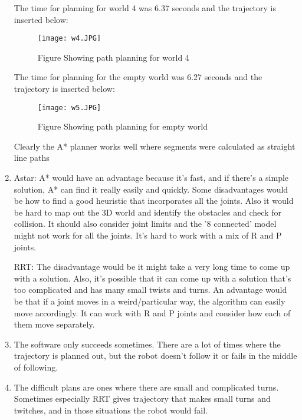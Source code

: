 \documentclass{article}
\begin{document}
\begin{enumerate}
    The time for planning for world 4 was 6.37 seconds  and the trajectory is inserted below: \\ 
    \renewcommand{\thefigure}{5.1.4.4}
\begin{center}
    \begin{figure}[H]
        \centering
        \texttt{[image: w4.JPG]}
         \caption{Figure Showing path planning for world 4}
    \end{figure}
\end{center}

   The time for planning for the empty world  was 6.27 seconds  and the trajectory is inserted below: \\ 
    \renewcommand{\thefigure}{5.1.4.5}
\begin{center}
    \begin{figure}[H]
        \centering
        \texttt{[image: w5.JPG]}
         \caption{Figure Showing path planning for empty world}
    \end{figure}
\end{center}


Clearly the A* planner works well where segments were calculated as straight line paths 
    
    \item Astar: A* would have an advantage because it's fast, and if there's a simple solution, A* can find it really easily and quickly. Some disadvantages would be how to find a good heuristic that incorporates all the joints. Also it would be hard to map out the 3D world and identify the obstacles and check for collision. It should also consider joint limits and the '8 connected' model might not work for all the joints. It's hard to work with a mix of R and P joints.
    
    RRT: The disadvantage would be it might take a very long time to come up with a solution. Also, it's possible that it can come up with a solution that's too complicated and has many small twists and turns. An advantage would be that if a joint moves in a weird/particular way, the algorithm can easily move accordingly. It can work with R and P joints and consider how each of them move separately.
    
    \item The software only succeeds sometimes. There are a lot of times where the trajectory is planned out, but the robot doesn't follow it or fails in the middle of following. 
    
    \item The difficult plans are ones where there are small and complicated turns. Sometimes especially RRT gives trajectory that makes small turns and twitches, and in those situations the robot would fail.
    

\end{enumerate}
\end{document}
